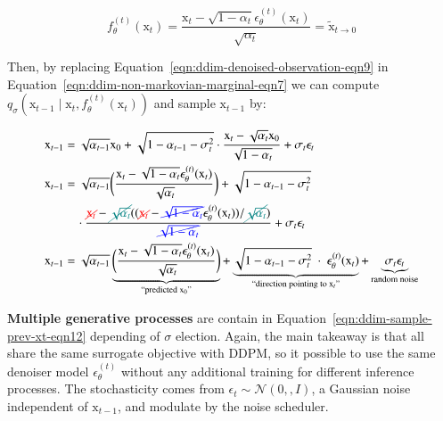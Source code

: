 \begin{equation}\label{eqn:ddim-denoised-observation-eqn9}
    f_{\theta}^{(t)}(\mathrm{x}_{t}) = \frac{\mathrm{x}_{t} - \sqrt{1-\alpha_{t}}\epsilon_{\theta}^{(t)}(\mathrm{x}_{t})}{\sqrt{\alpha_{t}}} = \tilde{\mathrm{x}}_{t\rightarrow 0} 
\end{equation}

\noindent Then, by replacing Equation~\ref{eqn:ddim-denoised-observation-eqn9} in Equation~\ref{eqn:ddim-non-markovian-marginal-eqn7} we can compute $q_{\sigma}(\mathrm{x}_{t-1}\mid\mathrm{x}_{t}, f_{\theta}^{(t)}(\mathrm{x}_{t}))$ and sample $\mathrm{x}_{t-1}$ by:

\begin{equation}\label{eqn:ddim-sample-prev-xt-eqn12}
    \begin{split}
    \mathrm{x}_{t-1} &= \sqrt{\alpha_{t-1}}\mathrm{x}_{0} + \sqrt{1-\alpha_{t-1}-\sigma_{t}^{2}}\cdot\frac{\mathrm{x}_{t} - \sqrt{\alpha_{t}}\mathrm{x}_{0}}{\sqrt{1-\alpha_{t}}} + \sigma_{t}\epsilon_{t} \\ 
    \mathrm{x}_{t-1} &= \sqrt{\alpha_{t-1}}\bigg(\frac{\mathrm{x}_{t} - \sqrt{1 - \alpha_{t}}\epsilon_{\theta}^{(t)}(\mathrm{x}_{t})}{\sqrt{\alpha_{t}}}\bigg) + \sqrt{1 - \alpha_{t-1} - \sigma_{t}^{2}} \\ &~~~~ \cdot\frac{\textcolor{red}{\cancel{\mathrm{x}_{t}}} - \textcolor{teal}{\cancel{\sqrt{\alpha_t}}}((\textcolor{red}{\cancel{\mathrm{x}_{t}}}-\textcolor{blue}{\cancel{\sqrt{1-\alpha_{t}}}}\epsilon_{\theta}^{(t)}(\mathrm{x}_{t})) / \textcolor{teal}{\cancel{\sqrt{\alpha_{t}}}})}{\textcolor{blue}{\cancel{\sqrt{1-\alpha_{t}}}}} + \sigma_{t}\epsilon_{t} \\
    \mathrm{x}_{t-1} &= 
    \sqrt{\alpha_{t-1}}\underbrace{\bigg(\frac{\mathrm{x}_{t}-\sqrt{1-\alpha_{t}}\epsilon_{\theta}^{(t)}(\mathrm{x}_{t})}{\sqrt{\alpha_{t}}}\bigg)}_{\text{``predicted $\mathrm{x}_{0}$''}} 
    + \underbrace{\sqrt{1-\alpha_{t-1} - \sigma^2_{t}}~\cdot~\epsilon_{\theta}^{(t)}(\mathrm{x}_{t})}_{\text{``direction pointing to $\mathrm{x}_{t}$''}}
    + \underbrace{\sigma_{t}\epsilon_{t}}_{\text{random noise}}
    \end{split}
\end{equation}

\noindent \textbf{Multiple generative processes} are contain in Equation~\ref{eqn:ddim-sample-prev-xt-eqn12} depending of $\sigma$ election. Again,
the main takeaway is that all share the same surrogate objective with DDPM, so
it possible to use the same denoiser model $\epsilon_{\theta}^{(t)}$ without any additional training for different inference processes. The stochasticity comes from $\epsilon_{t}\sim\mathcal{N}(0,, I)$, a Gaussian noise independent of $\mathrm{x}_{t-1}$, and modulate by the noise scheduler. \\


